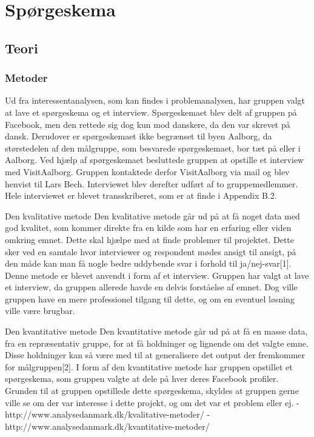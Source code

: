 \chapter{Spørgeskema}

\section{Teori}
\subsection{Metoder}
Ud fra interessentanalysen, som kan findes i problemanalysen, har gruppen valgt at lave et spørgeskema og et interview. Spørgeskemaet blev delt af gruppen på Facebook, men den rettede sig dog kun mod danskere, da den var skrevet på dansk. Derudover er spørgeskemaet ikke begrænset til byen Aalborg, da størstedelen   af den målgruppe, som besvarede spørgeskemaet, bor tæt på eller i Aalborg.
Ved hjælp af spørgeskemaet besluttede gruppen at opstille et interview med VisitAalborg. Gruppen kontaktede derfor VisitAalborg via mail og blev henvist til Lars Bech. Interviewet blev derefter udført af to gruppemedlemmer. Hele interviewet er blevet transskriberet, som er at finde i Appendix B.2.

Den kvalitative metode \newline
Den kvalitative metode går ud på at få noget data med god kvalitet, som kommer direkte fra en kilde som har en erfaring eller viden omkring emnet. Dette skal hjælpe med at finde problemer til projektet. Dette sker ved en samtale hvor interviewer og respondent mødes ansigt til ansigt, på den måde kan man få nogle bedre uddybende svar i forhold til ja/nej-svar[1]. 
Denne metode er blevet anvendt i form af et interview. Gruppen har valgt at lave et interview, da gruppen allerede havde en delvis forståelse af emnet. Dog ville gruppen have en mere professionel tilgang til dette,  og om en eventuel løsning ville være brugbar. 

Den kvantitative metode \newline
Den kvantitative metode går ud på at få en masse data, fra en repræsentativ gruppe, for at få holdninger og lignende om det valgte emne. Disse holdninger kan så være med til at generalisere det output der fremkommer for målgruppen[2].
I form af den kvantitative metode har gruppen opstillet et spørgeskema, som gruppen valgte at dele på hver deres Facebook profiler. Grunden til at gruppen opstillede dette spørgeskema, skyldes at gruppen gerne ville se om der var interesse i dette projekt, og om det var et problem eller ej. \newline
[1] - http://www.analysedanmark.dk/kvalitative-metoder/ \newline
[2] - http://www.analysedanmark.dk/kvantitative-metoder/ 


